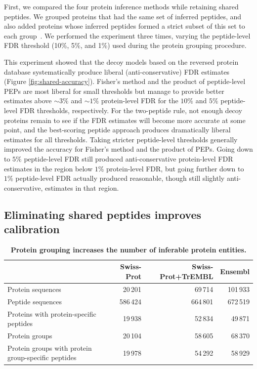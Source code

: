 \documentclass{article}
\begin{document}
First, we compared the four protein inference methods while retaining
shared peptides. We grouped proteins that had the same set of
inferred peptides, and also added proteins whose inferred peptides
formed a strict subset of this set to each
group~\cite{nesvizhskii2005interpretation, serang2012review}.  We
performed the experiment three times, varying the peptide-level FDR
threshold (10\%, 5\%, and 1\%) used during the protein grouping
procedure.

This experiment showed that the decoy models based on the reversed
protein database systematically produce liberal (anti-conservative)
FDR estimates (Figure \ref{fig:shared-accuracy}). Fisher's method and
the product of peptide-level PEPs are most liberal for small
thresholds but manage to provide better estimates above $\sim 3\%$ and
$\sim 1\%$ protein-level FDR for the $10\%$ and $5\%$ peptide-level
FDR thresholds, respectively. For the two-peptide rule, not enough
decoy proteins remain to see if the FDR estimates will become more
accurate at some point, and the best-scoring peptide approach produces
dramatically liberal estimates for all thresholds. Taking stricter
peptide-level thresholds generally improved the accuracy for Fisher's
method and the product of PEPs. Going down to $5\%$ peptide-level FDR
still produced anti-conservative protein-level FDR estimates in the
region below $1\%$ protein-level FDR, but going further down to $1\%$
peptide-level FDR actually produced reasonable, though still slightly
anti-conservative, estimates in that region.

\subsection*{Eliminating shared peptides improves calibration}

\begin{table}
\caption{\label{tab:duplicate-proteins}\textbf{Protein grouping
    increases the number of inferable protein entities.}}
\scriptsize
\begin{center}
\begin{tabular}{lrrr}
\hline
& Swiss-Prot & Swiss-Prot+TrEMBL & Ensembl\\
\hline
Protein sequences & 20\,201 & 69\,714 & 101\,933\\
Peptide sequences & 586\,424 & 664\,801 & 672\,519\\
Proteins with protein-specific peptides & 19\,938 & 52\,834 &
49\,871\\
Protein groups & 20\,104 & 58\,605 & 68\,370\\
Protein groups with protein group-specific peptides & 19\,978 &
54\,292 & 58\,929\\
\hline
\end{tabular}
\end{center}
\end{table}
\end{document}
